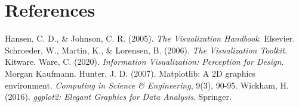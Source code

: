 \documentclass[11pt]{article}
\begin{document}
\section{References}
	
\begin{thebibliography}{9}
	 Hansen, C. D., \& Johnson, C. R. (2005). \textit{The Visualization Handbook}. Elsevier.
	 Schroeder, W., Martin, K., \& Lorensen, B. (2006). \textit{The Visualization Toolkit}. Kitware.
	 Ware, C. (2020). \textit{Information Visualization: Perception for Design}. Morgan Kaufmann.
	 Hunter, J. D. (2007). Matplotlib: A 2D graphics environment. \textit{Computing in Science \& Engineering}, 9(3), 90-95.
	 Wickham, H. (2016). \textit{ggplot2: Elegant Graphics for Data Analysis}. Springer.
\end{thebibliography}
	
\end{document}
